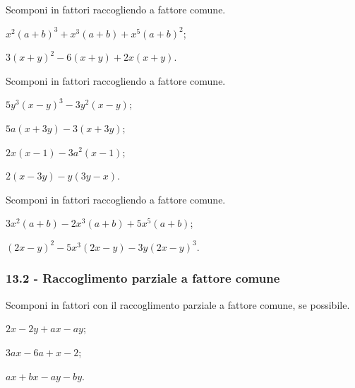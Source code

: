 \begin{esercizio}[\Ast]
Scomponi in fattori raccogliendo a fattore comune.
\label{ese:13.14}
 \begin{multicols}{2}
 \begin{enumeratea}
 \item $x^{2}(a+b)^{3}+x^{3}(a+b)+x^{5}(a+b)^{2}$;
 \item $3(x+y)^{2}-6(x+y)+2x(x+y)$.
\end{enumeratea}
 \end{multicols}
\end{esercizio}

\begin{esercizio}
\label{ese:13.15}
Scomponi in fattori raccogliendo a fattore comune.
\begin{multicols}{2}
\begin{enumeratea}
 \item $5y^{3}(x-y)^{3}-3y^{2}(x-y)$;
 \item $5a(x+3y)-3(x+3y)$;
 \item $2x(x-1)-3a^{2}(x-1)$;
 \item $2(x-3y)-y(3y-x)$.
\end{enumeratea}
\end{multicols}
\end{esercizio}

\begin{esercizio}[\Ast]
Scomponi in fattori raccogliendo a fattore comune.
\label{ese:13.16}
\begin{multicols}{2}
 \begin{enumeratea}
 \item $3x^{2}(a+b)-2x^{3}(a+b)+5x^{5}(a+b)$;
 \item $(2x-y)^{2}-5x^{3}(2x-y)-3y(2x-y)^{3}$.
\end{enumeratea}
\end{multicols}
\end{esercizio}
\pagebreak
\subsubsection*{13.2 - Raccoglimento parziale a fattore comune}

\begin{esercizio}[\Ast]
\label{ese:13.17}
Scomponi in fattori con il raccoglimento parziale a fattore comune, se possibile.
\begin{multicols}{3}
 \begin{enumeratea}
 \item $2x-2y+ax-ay$;
 \item $3ax-6a+x-2$;
 \item $ax+bx-ay-by$.
\end{enumeratea}
\end{multicols}
\end{esercizio}

